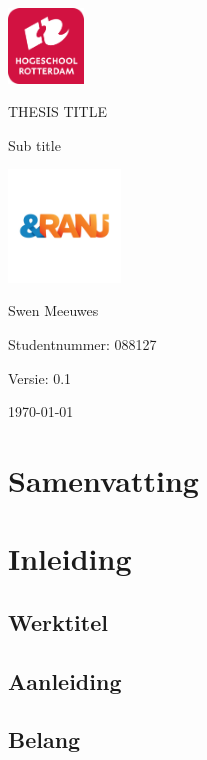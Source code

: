 \documentclass{report}
\newcommand{\versionnumber}{0.1}
\newcommand{\name}{Swen Meeuwes}
\newcommand{\studentnumber}{088127}
\renewcommand{\title}{THESIS TITLE}
\newcommand{\subtitle}{Sub title}
\begin{document}
\begin{titlepage}
        \centering
        \includegraphics[width=2cm]{Images/University}\par
        \vspace{4\baselineskip}
        {\Huge\title\par}
        {\Large\subtitle\par}
        \par
        \includegraphics[width=3cm]{Images/Organisation}
        \vspace{4\baselineskip}
        \par
        {\Large\name\par}
        {Studentnummer: \studentnumber\par}
        \vfill
        {\hfill Versie: \versionnumber\par}
        {\hfill \today}
\end{titlepage}

\chapter*{Samenvatting}

\newpage

\tableofcontents

\newpage

\chapter{Inleiding}
\section{Werktitel}

\section{Aanleiding}

\section{Belang}
\end{document}
